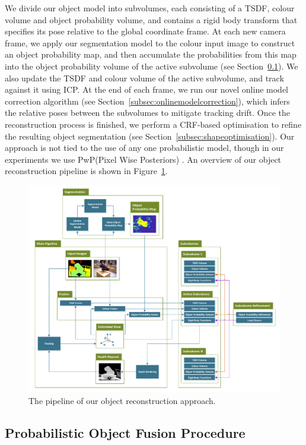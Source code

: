 We divide our object model into subvolumes, each consisting of a TSDF, 
colour volume and object probability volume, and contains a rigid body transform that specifies its pose relative to the global coordinate frame. At each new camera frame, we apply our segmentation model to the colour input image to construct an object probability map, and then accumulate the probabilities from this map into the object probability volume of the active subvolume (see Section~\ref{subsec:probfusion}). We also update the TSDF and colour volume of the active subvolume, and track against it using ICP. At the end of each frame, we run our novel online model correction algorithm (see Section~\ref{subsec:onlinemodelcorrection}), which infers the relative poses between the subvolumes to mitigate tracking drift. Once the reconstruction process is finished, we perform a CRF-based optimisation to refine the resulting object segmentation (see Section~\ref{subsec:shapeoptimisation}). Our approach is not tied to the use of any one probabilistic model, though in our experiments we use PwP(Pixel Wise Posteriors) \cite{Bibby2008}. An overview of our object reconstruction pipeline is shown in Figure~\ref{pipelineDiagram}.

\begin{figure}[!t]
	\centering
	\includegraphics[width=0.7\linewidth]{pipeline.pdf}
	\vspace{-3mm}
	\caption{The pipeline of our object reconstruction approach.}
	\label{pipelineDiagram}
\end{figure}

\subsection{Probabilistic Object Fusion Procedure}
\label{subsec:probfusion}

